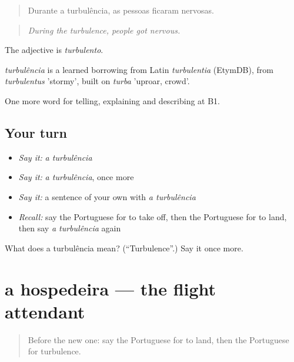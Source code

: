 \begin{quote}
Durante a turbulência, as pessoas ficaram nervosas.
\end{quote}

\begin{quote}
\emph{During the turbulence, people got nervous.}
\end{quote}

The adjective is \emph{turbulento}.

\begin{cousinweb}
\emph{turbulência} is a learned borrowing from Latin \emph{turbulentia} (EtymDB), from \emph{turbulentus} 'stormy', built on \emph{turba} 'uproar, crowd'.
\end{cousinweb}

\begin{grammarlens}[title={What you've built}]
One more word for telling, explaining and describing at B1.
\end{grammarlens}

\subsection*{Your turn}
\begin{itemize}
\raggedright
  \item \emph{Say it:} \emph{a turbulência}
  \item \emph{Say it:} \emph{a turbulência}, once more
  \item \emph{Say it:} a sentence of your own with \emph{a turbulência}
  \item \emph{Recall:} say the Portuguese for to take off, then the Portuguese for to land, then say \emph{a turbulência} again
\end{itemize}

\begin{tcolorbox}[breakable,colback=teal!4,colframe=teal!35!black,title={Before you move on}]
What does a turbulência mean? (\textquotedblleft{}Turbulence\textquotedblright{}.) Say it once more.
\end{tcolorbox}
\section[a hospedeira]{a hospedeira — the flight attendant}

\label{lesson:PT-C424-hospedeira}



\begin{quote}
Before the new one: say the Portuguese for to land, then the Portuguese for turbulence.
\end{quote}


